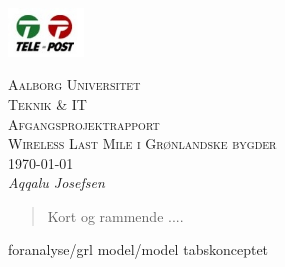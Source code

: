\documentclass[11pt,a4paper]{report}
\begin{document}
\begin{titlepage}
 \begin{flushright}
  \includegraphics[width=0.15\textwidth]{./telelogo}~\\[1cm] %
 \end{flushright}
 \begin{center}
  \textsc{\LARGE Aalborg Universitet}\\[.5cm]
  \textsc{\Large  Teknik \& IT}\\[.5cm]
  \textsc{\large  Afgangsprojektrapport}\\[3cm]
  \textsc{\huge Wireless Last Mile i Grønlandske bygder}\\[3cm]
  \large \today\\[0.5cm]
  \emph{Aqqalu Josefsen}\\[0.6cm]
 \end{center}
\end{titlepage}

\begin{abstract}
Kort og rammende ....
\end{abstract}

{foranalyse/grl}
{model/model}
{tabskonceptet}


\renewcommand\appendixname{Appendix}
\begin{appendices}

\end{appendices}

\nocite{*}
\printbibliography
\end{document}
